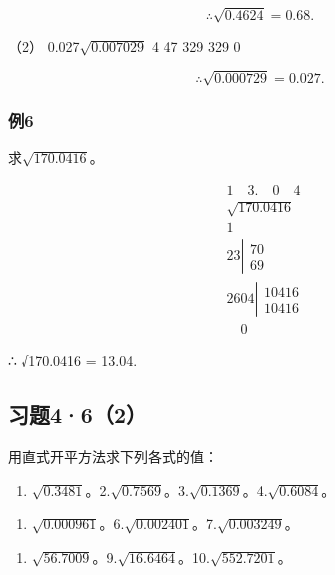 \[
\therefore \sqrt {0.4624} = 0.68.
\]

（2） 0.027\(\sqrt{0.007029}\) 4 47 329 329 0

\[
\therefore \sqrt {0.000729} = 0.027.
\]

\subsubsection{例6}

求\(\sqrt{170.0416}\)。


\[
\begin{array}{rl} & 1 \quad 3. \quad 0 \quad 4 \\ & \sqrt {170.0416} \\ & 1 \\ & 23 \left| \begin{array}{c} 70 \\ 69 \end{array} \right. \\ & 2604 \left| \begin{array}{c} 10416 \\ 10416 \end{array} \right. \\ & \quad 0 \end{array}
\]

∴ √170.0416 = 13.04.

\subsection{习题4·6（2）}

用直式开平方法求下列各式的值：

\begin{enumerate}[start=1]
\item
  \(\sqrt{0.3481}\)。2.\(\sqrt{0.7569}\)。3.\(\sqrt{0.1369}\)。4.\(\sqrt{0.6084}\)。
\end{enumerate}

\begin{enumerate}[start=5]
\item
  \(\sqrt{0.000961}\)。6.\(\sqrt{0.002401}\)。7.\(\sqrt{0.003249}\)。
\end{enumerate}

\begin{enumerate}[start=8]
\item
  \(\sqrt{56.7009}\)。9.\(\sqrt{16.6464}\)。10.\(\sqrt{552.7201}\)。
\end{enumerate}


